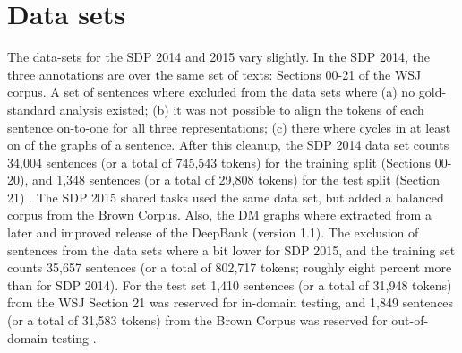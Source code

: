\section{Data sets}
\label{sec:data-sets}

The data-sets for the SDP 2014 and 2015 vary slightly. In the SDP 2014, the three annotations are over the same set of texts: Sections 00-21 of the WSJ corpus. A set of sentences where excluded from the data sets where (a) no gold-standard analysis existed; (b) it was not possible to align the tokens of each sentence on-to-one for all three representations; (c) there where cycles in at least on of the graphs of a sentence. After this cleanup, the SDP 2014 data set counts 34,004 sentences (or a total of 745,543 tokens) for the training split (Sections 00-20), and 1,348 sentences (or a total of 29,808 tokens) for the test split (Section 21) \cite{Oepen:14}. The SDP 2015 shared tasks used the same data set, but added a balanced corpus from the Brown Corpus. Also, the DM graphs where extracted from a later and improved release of the DeepBank (version 1.1). The exclusion of sentences from the data sets where a bit lower for SDP 2015, and the training set counts 35,657 sentences (or a total of 802,717 tokens; roughly eight percent more than for SDP 2014). For the test set 1,410 sentences (or a total of 31,948 tokens) from the WSJ Section 21 was reserved for in-domain testing, and 1,849 sentences (or a total of 31,583 tokens) from the Brown Corpus was reserved for out-of-domain testing \cite{Oepen:15}.


